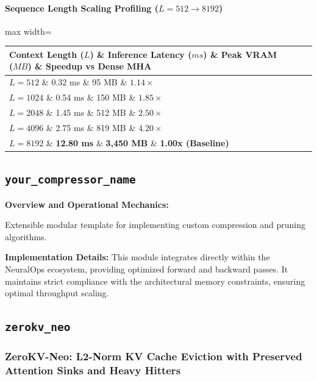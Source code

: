 \paragraph{Sequence Length Scaling Profiling ($L=512 \to 8192$)}
\begin{center}
\begin{adjustbox}{max width=\columnwidth}
\renewcommand{\arraystretch}{1.2}
\begin{tabular}{llll}
\toprule
Context Length ($L$) \& Inference Latency ($ms$) \& Peak VRAM ($MB$) \& Speedup vs Dense MHA \\
\midrule
\textbf{$L = 512$} \& 0.32 ms \& 95 MB \& $1.14\times$ \\
\textbf{$L = 1024$} \& 0.54 ms \& 150 MB \& $1.85\times$ \\
\textbf{$L = 2048$} \& 1.45 ms \& 512 MB \& $2.50\times$ \\
\textbf{$L = 4096$} \& 2.75 ms \& 819 MB \& $4.20\times$ \\
\textbf{$L = 8192$} \& \textbf{12.80 ms} \& \textbf{3,450 MB} \& \textbf{1.00x (Baseline)} \\


\bottomrule
\end{tabular}
\end{adjustbox}
\end{center}

\subsection{\texttt{your\_compressor\_name}}
\textbf{Overview and Operational Mechanics:}

Extensible modular template for implementing custom compression and pruning algorithms.

\textbf{Implementation Details:}
This module integrates directly within the NeuralOps ecosystem, providing optimized forward and backward passes. It maintains strict compliance with the architectural memory constraints, ensuring optimal throughput scaling.

\subsection{\texttt{zerokv\_neo}}
\subsubsection*{ZeroKV-Neo: L2-Norm KV Cache Eviction with Preserved Attention Sinks and Heavy Hitters}


